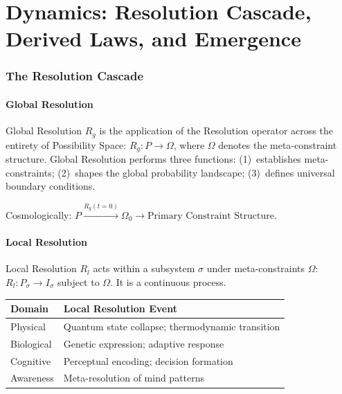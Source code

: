 \documentclass[12pt, a4paper]{article}
\begin{document}
\part{Dynamics: Resolution Cascade, Derived Laws, and Emergence}

\section{The Resolution Cascade}

\subsection{Global Resolution}

Global Resolution $R_g$ is the application of the Resolution operator across the entirety
of Possibility Space: $R_g: P \to \Omega$, where $\Omega$ denotes the meta-constraint
structure. Global Resolution performs three functions: (1)~establishes meta-constraints;
(2)~shapes the global probability landscape; (3)~defines universal boundary conditions.

Cosmologically: $P \xrightarrow{R_g(t=0)} \Omega_0 \to \text{Primary Constraint Structure}$.

\subsection{Local Resolution}

Local Resolution $R_l$ acts within a subsystem $\sigma$ under meta-constraints $\Omega$:
$R_l: P_\sigma \to I_\sigma$ subject to $\Omega$. It is a continuous process.

\begin{center}
\renewcommand{\arraystretch}{1.2}
\begin{tabular}{ll}
\toprule
\textbf{Domain} & \textbf{Local Resolution Event} \\
\midrule
Physical & Quantum state collapse; thermodynamic transition \\
Biological & Genetic expression; adaptive response \\
Cognitive & Perceptual encoding; decision formation \\
Awareness & Meta-resolution of mind patterns \\
\bottomrule
\end{tabular}
\end{center}
\end{document}
